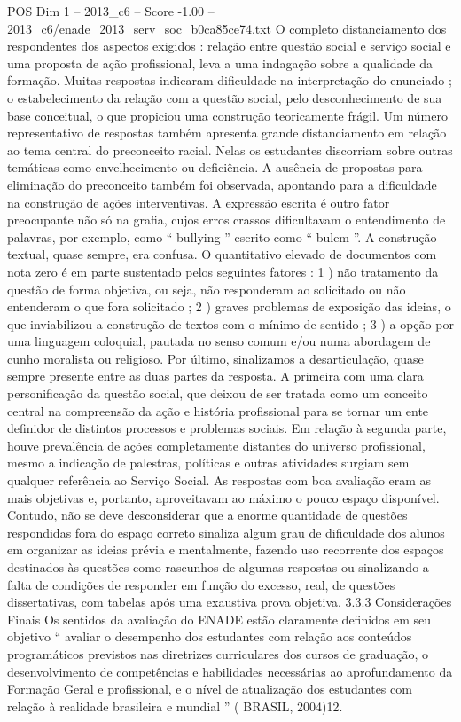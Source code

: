 \begin{textsample}{POS Dim 1 – 2013\_c6 – Score -1.00 – 2013\_c6/enade\_2013\_serv\_soc\_b0ca85ce74.txt}
O completo distanciamento dos respondentes dos aspectos exigidos : relação entre questão social e serviço social e uma proposta de ação profissional, leva a uma indagação sobre a qualidade da formação.
Muitas respostas indicaram dificuldade na interpretação do enunciado ; o estabelecimento da relação com a questão social, pelo desconhecimento de sua base conceitual, o que propiciou uma construção teoricamente frágil.
Um número representativo de respostas também apresenta grande distanciamento em relação ao tema central do preconceito racial.
Nelas os estudantes discorriam sobre outras temáticas como envelhecimento ou deficiência.
A ausência de propostas para eliminação do preconceito também foi observada, apontando para a dificuldade na construção de ações interventivas.
A expressão escrita é outro fator preocupante não só na grafia, cujos erros crassos dificultavam o entendimento de palavras, por exemplo, como “ bullying ” escrito como “ bulem ”.
A construção textual, quase sempre, era confusa.
O quantitativo elevado de documentos com nota zero é em parte sustentado pelos seguintes fatores : 1 ) não tratamento da questão de forma objetiva, ou seja, não responderam ao solicitado ou não entenderam o que fora solicitado ; 2 ) graves problemas de exposição das ideias, o que inviabilizou a construção de textos com o mínimo de sentido ; 3 ) a opção por uma linguagem coloquial, pautada no senso comum e/ou numa abordagem de cunho moralista ou religioso.
Por último, sinalizamos a desarticulação, quase sempre presente entre as duas partes da resposta.
A primeira com uma clara personificação da questão social, que deixou de ser tratada como um conceito central na compreensão da ação e história profissional para se tornar um ente definidor de distintos processos e problemas sociais.
Em relação à segunda parte, houve prevalência de ações completamente distantes do universo profissional, mesmo a indicação de palestras, políticas e outras atividades surgiam sem qualquer referência ao Serviço Social.
As respostas com boa avaliação eram as mais objetivas e, portanto, aproveitavam ao máximo o pouco espaço disponível.
Contudo, não se deve desconsiderar que a enorme quantidade de questões respondidas fora do espaço correto sinaliza algum grau de dificuldade dos alunos em organizar as ideias prévia e mentalmente, fazendo uso recorrente dos espaços destinados às questões como rascunhos de algumas respostas ou sinalizando a falta de condições de responder em função do excesso, real, de questões dissertativas, com tabelas após uma exaustiva prova objetiva. 3.3.3 Considerações Finais Os sentidos da avaliação do ENADE estão claramente definidos em seu objetivo “ avaliar o desempenho dos estudantes com relação aos conteúdos programáticos previstos nas diretrizes curriculares dos cursos de graduação, o desenvolvimento de competências e habilidades necessárias ao aprofundamento da Formação Geral e profissional, e o nível de atualização dos estudantes com relação à realidade brasileira e mundial ” ( BRASIL, 2004)12.

\end{textsample}
